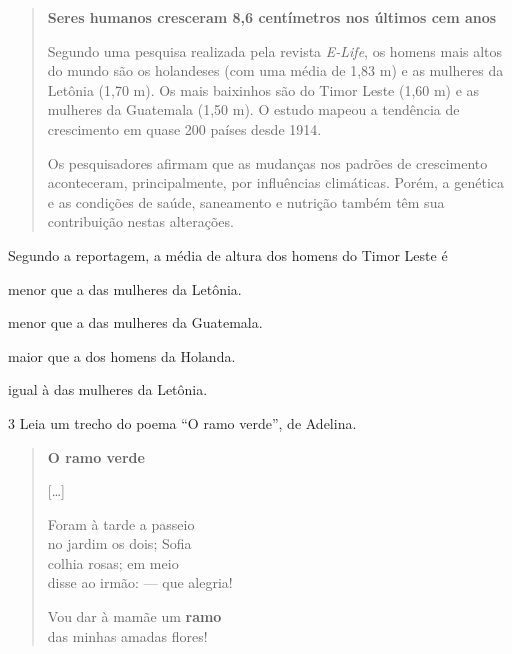 \begin{quote}
\textbf{Seres humanos cresceram 8,6 centímetros nos últimos cem anos}

Segundo uma pesquisa realizada pela revista \textit{E-Life}, os homens
mais altos do mundo são os holandeses (com uma média de 1,83 m) e as
mulheres da Letônia (1,70 m). Os mais baixinhos são do Timor Leste (1,60 m)
e as mulheres da Guatemala (1,50 m). O estudo mapeou a tendência de
crescimento em quase 200 países desde 1914.

Os pesquisadores afirmam que as mudanças nos padrões de crescimento
aconteceram, principalmente, por influências climáticas. Porém, a 
genética e as condições de saúde, saneamento e nutrição também têm sua
contribuição nestas alterações.

\end{quote}

Segundo a reportagem, a média de altura dos homens do Timor Leste é

\begin{escolha}
\item menor que a das mulheres da Letônia.

\item menor que a das mulheres da Guatemala.

\item maior que a dos homens da Holanda.

\item igual à das mulheres da Letônia.
\end{escolha}


\num{3} Leia um trecho do poema ``O ramo verde'', de Adelina.

\begin{verse}
\textbf{O ramo verde}

{[}\ldots{}{]}

Foram à tarde a passeio\\
no jardim os dois; Sofia\\
colhia rosas; em meio\\
disse ao irmão: --- que alegria!

Vou dar à mamãe um \textbf{ramo}\\
das minhas amadas flores!
\end{verse}


